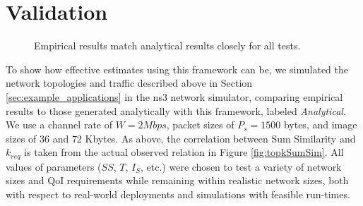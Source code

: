 \section{Validation}
\label{sec:validation}

\begin{figure}[]
\centering
   \caption{Empirical results match analytical results closely for all tests.}
   \label{fig:scal_vs_qoi}
\end{figure}

To show how effective estimates using this framework can be, we simulated the network topologies and traffic described above in Section \ref{sec:example_applications} in the ns3 network simulator, comparing empirical results to those generated analytically with this framework, labeled \emph{Analytical}.  
We use a channel rate of $W= 2 Mbps$, packet sizes of $P_s = 1500$ bytes, and image sizes of $36$ and $72$ Kbytes.  As above, the correlation between Sum Similarity and $k_{req}$ is taken from the actual observed relation in Figure \ref{fig:topkSumSim}.  All values of parameters ($SS$, $T$, $I_S$, etc.) were chosen to test a variety of network sizes and QoI requirements while remaining within realistic network sizes, both with respect to real-world deployments and simulations with feasible run-times.



